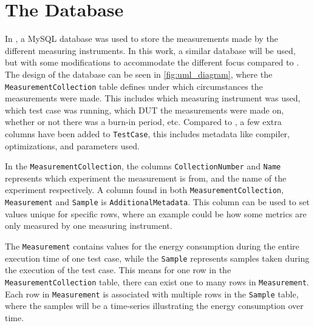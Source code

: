 \section{The Database}\label{app:database}

In \cite{biksbois}, a MySQL database was used to store the measurements made by the different measuring instruments. In this work, a similar database will be used, but with some modifications to accommodate the different focus compared to \cite{biksbois}. The design of the database can be seen in \cref{fig:uml_diagram}, where the \texttt{MeasurementCollection} table defines under which circumstances the measurements were made. This includes which measuring instrument was used, which test case was running, which DUT the measurements were made on, whether or not there was a burn-in period, etc. Compared to \cite{biksbois}, a few extra columns have been added to \texttt{TestCase}, this includes metadata like compiler, optimizations, and parameters used.


In the \texttt{MeasurementCollection}, the columns \texttt{CollectionNumber} and \texttt{Name} represents which experiment the measurement is from, and the name of the experiment respectively. A column found in both \texttt{MeasurementCollection}, \texttt{Measurement} and \texttt{Sample} is \texttt{AdditionalMetadata}. This column can be used to set values unique for specific rows, where an example could be how some metrics are only measured by one measuring instrument.



The \texttt{Measurement} contains values for the energy consumption during the entire execution time of one test case, while the \texttt{Sample} represents samples taken during the execution of the test case. This means for one row in the \texttt{MeasurementCollection} table, there can exist one to many rows in \texttt{Measurement}. Each row in \texttt{Measurement} is associated with multiple rows in the \texttt{Sample} table, where the samples will be a time-series illustrating the energy consumption over time.


